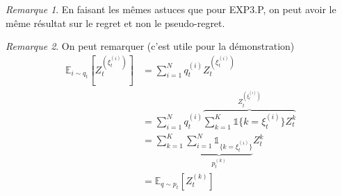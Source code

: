 \documentclass{article}
\theoremstyle{remark}
\theoremstyle{remark}
\newtheorem{remark}{Remarque}[section]
\begin{document}
\begin{remark}
   En faisant les mêmes astuces que pour EXP3.P, on peut avoir le même résultat sur le regret et non le pseudo-regret.
\end{remark}

\begin{remark}
   On peut remarquer (c'est utile pour la démonstration)
   \begin{align*}
      \mathbb{E}_{i \sim q_t} \left[Z_t^{(\xi_t^{(i)})}\right]
      &= \sum_{i=1}^N q_t^{(i)} Z_t^{(\xi_t^{(i)})} \\
      &= \sum_{i=1}^N q_t^{(i)} \overbrace{\sum_{k=1}^K \mathbb{1}{\{k = \xi_t^{(i)}\}} Z_t^{k}}^{Z_t^{(\xi_t^{(i)})}} \\
      &= \sum_{k=1}^K \underbrace{\sum_{i=1}^N \mathbb{1}_{\{k = \xi_t^{(i)}\}}}_{p_t^{(k)}} Z_t^{k} \\
      &= \mathbb{E}_{q \sim p_t} \left[Z_t^{(k)}\right]
   \end{align*}
\end{remark}
\end{document}
